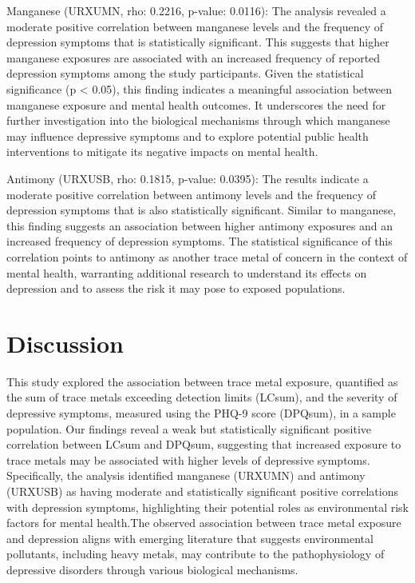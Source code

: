 \documentclass[
  man,floatsintext]{apa6}
\begin{document}
Manganese (URXUMN, rho: 0.2216, p-value: 0.0116): The analysis revealed a moderate positive correlation between manganese levels and the frequency of depression symptoms that is statistically significant. This suggests that higher manganese exposures are associated with an increased frequency of reported depression symptoms among the study participants. Given the statistical significance (p \textless{} 0.05), this finding indicates a meaningful association between manganese exposure and mental health outcomes. It underscores the need for further investigation into the biological mechanisms through which manganese may influence depressive symptoms and to explore potential public health interventions to mitigate its negative impacts on mental health.

Antimony (URXUSB, rho: 0.1815, p-value: 0.0395): The results indicate a moderate positive correlation between antimony levels and the frequency of depression symptoms that is also statistically significant. Similar to manganese, this finding suggests an association between higher antimony exposures and an increased frequency of depression symptoms. The statistical significance of this correlation points to antimony as another trace metal of concern in the context of mental health, warranting additional research to understand its effects on depression and to assess the risk it may pose to exposed populations.

\hypertarget{discussion}{%
\section{Discussion}\label{discussion}}

This study explored the association between trace metal exposure, quantified as the sum of trace metals exceeding detection limits (LCsum), and the severity of depressive symptoms, measured using the PHQ-9 score (DPQsum), in a sample population. Our findings reveal a weak but statistically significant positive correlation between LCsum and DPQsum, suggesting that increased exposure to trace metals may be associated with higher levels of depressive symptoms. Specifically, the analysis identified manganese (URXUMN) and antimony (URXUSB) as having moderate and statistically significant positive correlations with depression symptoms, highlighting their potential roles as environmental risk factors for mental health.The observed association between trace metal exposure and depression aligns with emerging literature that suggests environmental pollutants, including heavy metals, may contribute to the pathophysiology of depressive disorders through various biological mechanisms.
\end{document}
